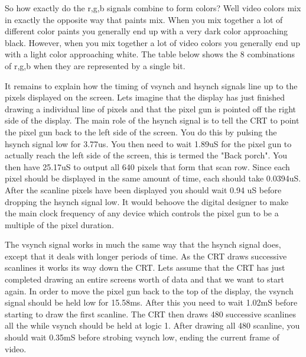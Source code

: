 So how exactly do the r,g,b signals combine to form colors? Well 
video colors mix in exactly the opposite way that paints mix. When 
you mix together a lot of different color paints you generally end 
up with a very dark color approaching black. However, when you mix 
together a lot of video colors you generally end up with a light 
color approaching white. The table below shows the 8 combinations 
of r,g,b when they are represented by a single bit.

\begin{table}[ht]
\end{table}

It remains to explain how the timing of vsynch and hsynch signals 
line up to the pixels displayed on the screen.  Lets imagine that
the display has just finished drawing a individual line of pixels
and that the pixel gun is pointed off the right side of the display.
The main role of the hsynch signal is to tell the CRT to point the
pixel gun back to the left side of the screen.  You do this by pulsing
the hsynch signal low for 3.77us.  You then need to wait 1.89uS for
the pixel gun to actually reach the left side of the screen, this is
termed the "Back porch".  You then have 25.17uS to output all 640 pixels
that form that scan row.  Since each pixel should be displayed in
the same amount of time, each should take 0.0394uS.  After the scanline
pixels have been displayed you should wait 0.94 uS before dropping
the hsynch signal low.  It would behoove the digital designer to make
the main clock frequency of any device which controls the pixel gun to
be a multiple of the pixel duration.

The vsynch signal works in much the same way that the hsynch signal
does, except that it deals with longer periods of time.  As the CRT
draws successive scanlines it works its way down the CRT.  Lets assume
that the CRT has just completed drawing an entire screens worth of
data and that we want to start again.  In order to move the pixel gun
back to the top of the display, the vsynch signal should be held low
for 15.58ms.  After this you need to wait 1.02mS before starting to
draw the first scanline.  The CRT then draws 480 successive scanlines
all the while vsynch should be held at logic 1.  After drawing all 480
scanline, you should wait 0.35mS before strobing vsynch low, ending the
current frame of video.

